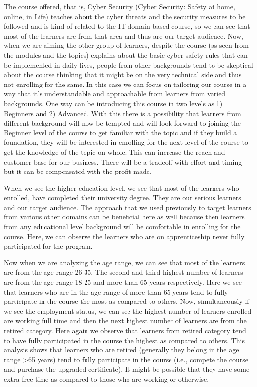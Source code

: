 \documentclass[
]{article}
\begin{document}
The course offered, that is, Cyber Security (Cyber Security: Safety at
home, online, in Life) teaches about the cyber threats and the security
measures to be followed and is kind of related to the IT domain-based
course, so we can see that most of the learners are from that area and
thus are our target audience. Now, when we are aiming the other group of
learners, despite the course (as seen from the modules and the topics)
explains about the basic cyber safety rules that can be implemented in
daily lives, people from other backgrounds tend to be skeptical about
the course thinking that it might be on the very technical side and thus
not enrolling for the same. In this case we can focus on tailoring our
course in a way that it's understandable and approachable from learners
from varied backgrounds. One way can be introducing this course in two
levels as 1) Beginners and 2) Advanced. With this there is a possibility
that learners from different background will now be tempted and will
look forward to joining the Beginner level of the course to get familiar
with the topic and if they build a foundation, they will be interested
in enrolling for the next level of the course to get the knowledge of
the topic on whole. This can increase the reach and customer base for
our business. There will be a tradeoff with effort and timing but it can
be compensated with the profit made.

When we see the higher education level, we see that most of the learners
who enrolled, have completed their university degree. They are our
serious learners and our target audience. The approach that we used
previously to target learners from various other domains can be
beneficial here as well because then learners from any educational level
background will be comfortable in enrolling for the course. Here, we can
observe the learners who are on apprenticeship never fully participated
for the program.

Now when we are analyzing the age range, we can see that most of the
learners are from the age range 26-35. The second and third highest
number of learners are from the age range 18-25 and more than 65 years
respectively. Here we see that learners who are in the age range of more
than 65 years tend to fully participate in the course the most as
compared to others. Now, simultaneously if we see the employment status,
we can see the highest number of learners enrolled are working full time
and then the next highest number of learners are from the retired
category. Here again we observe that learners from retired category tend
to have fully participated in the course the highest as compared to
others. This analysis shows that learners who are retired (generally
they belong in the age range \textgreater65 years) tend to fully
participate in the course (i.e., compete the course and purchase the
upgraded certificate). It might be possible that they have some extra
free time as compared to those who are working or otherwise.
\end{document}

